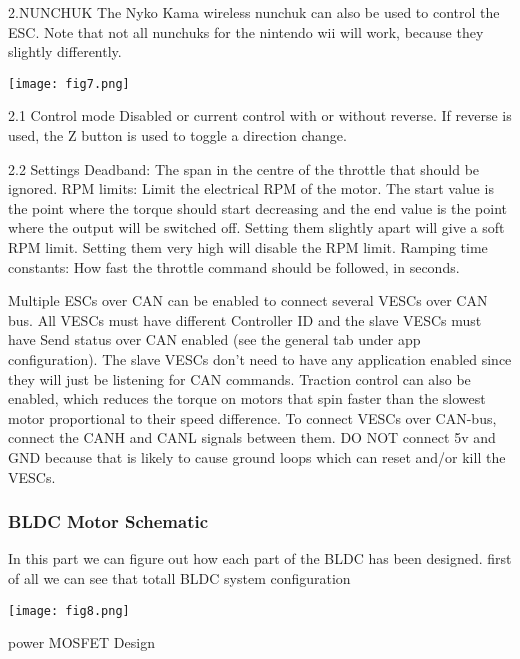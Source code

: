 \documentclass[11pt]{article}
\begin{document}
2.NUNCHUK\newline
The Nyko Kama wireless nunchuk can also be used to control the ESC. Note that not all nunchuks for the nintendo wii will work, because they slightly differently.\newline

\begin {center}
\texttt{[image: fig7.png]}\newline

\end{center}

2.1 Control mode\newline
Disabled or current control with or without reverse. If reverse is used, the Z button is used to toggle a direction change.\newline

2.2 Settings\newline
Deadband: The span in the centre of the throttle that should be ignored.\newline
RPM limits: Limit the electrical RPM of the motor. The start value is the point where the torque should start decreasing and the end value is the point where the output will be switched off. Setting them slightly apart will give a soft RPM limit. Setting them very high will disable the RPM limit.\newline
Ramping time constants: How fast the throttle command should be followed, in seconds.\newline

Multiple ESCs over CAN can be enabled to connect several VESCs over CAN bus. All VESCs must have different Controller ID and the slave VESCs must have Send status over CAN enabled (see the general tab under app configuration). The slave VESCs don’t need to have any application enabled since they will just be listening for CAN commands. Traction control can also be enabled, which reduces the torque on motors that spin faster than the slowest motor proportional to their speed difference. To connect VESCs over CAN-bus, connect the CANH and CANL signals between them. DO NOT connect 5v and GND because that is likely to cause ground loops which can reset and/or kill the VESCs.\newline

\subsubsection{BLDC Motor Schematic}
\label{BLDC Motor Schematic}
 In this part we can figure out how each part of the BLDC has been designed.\newline
first of all we can see that totall BLDC system configuration
\begin {center}
\texttt{[image: fig8.png]}\newline
\end{center}
 power MOSFET Design
\end{document}
